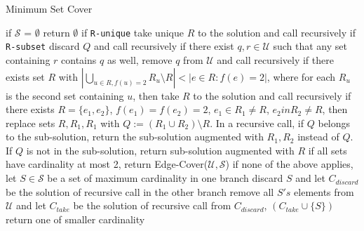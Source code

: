 \begin{algorithm}
\caption{Minimum Set Cover}
\label{alg:rooij}
\begin{algorithmic}[1]
\State if $\mathcal{S}$ = $\emptyset$ return $\emptyset$ 
\State if \texttt{R-unique} take unique $R$ to the solution and call recursively
\State if \texttt{R-subset} discard $Q$ and call recursively
\State if there exist $q, r \in \mathcal{U}$ such that any set containing $r$ contains $q$ as well, remove $q$ from $\mathcal{U}$ and call recursively
\State if there exists set $R$ with $|\bigcup_{u\in R, f(u) = 2} R_u \setminus R| < |e\in R : f(e) = 2|$, where for each $R_u$ is the second set containing $u$, then take $R$ to the solution and call recursively
\State if there exists $R = \{e_1, e_2\}$, $f(e_1) = f(e_2) = 2$, $e_1 \in R_1 \ne R$, $e_2 in R_2 \ne R$, then replace sets $R, R_1, R_1$ with $Q := (R_1 \cup R_2) \setminus R$. In a recursive call, if $Q$ belongs to the sub-solution, return the sub-solution augmented with $R_1, R_2$ instead of $Q$. If $Q$ is not in the sub-solution, return sub-solution augmented with $R$ 
\State if all sets have cardinality at most 2, return Edge-Cover($\mathcal{U}, \mathcal{S}$)
\State if none of the above applies, let $S \in \mathcal{S}$ be a set of maximum cardinality
\State in one branch discard $S$ and let $C_{discard}$ be the solution of recursive call
\State in the other branch remove all $S's$ elements from $\mathcal{U}$ and let $C_{take}$ be the solution of recursive call
\State from $C_{discard}$, $(C_{take} \cup \{S\})$ return one of smaller cardinality
\EndProcedure
\end{algorithmic}
\end{algorithm}

